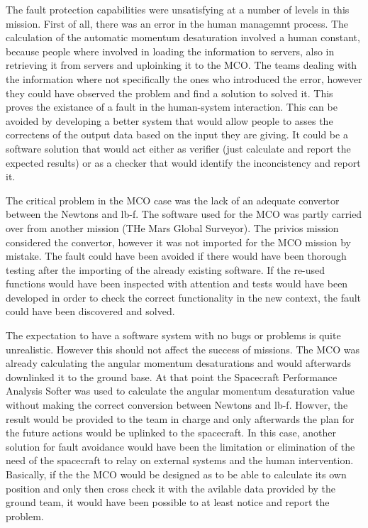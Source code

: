 The fault protection capabilities were unsatisfying at a number of levels in
this mission. First of all, there was an error in the human managemnt process.
The calculation of the automatic momentum desaturation involved a human
constant, because people where involved in loading the information to servers,
also in retrieving it from servers and uploinking it to the MCO. The teams
dealing with the information where not specifically the ones who introduced the
error, however they could have observed the problem and find a solution to
solved it. This proves the existance of a fault in the human-system interaction.
This can be avoided by developing a better system that would allow people to
asses the correctens of the output data based on the input they are giving. It
could be a software solution that would act either as verifier (just calculate
and report the expected results) or as a checker that would identify the
inconcistency and report it.

The critical problem in the MCO case was the lack of an adequate convertor
between the Newtons and lb-f. The software used for the MCO was partly carried
over from another mission (THe Mars Global Surveyor). The privios mission
considered the convertor, however it was not imported for the MCO mission by mistake. The fault could have been
avoided if there would have been thorough testing after the importing of the
already existing software. If the re-used functions would have been inspected
with attention and tests would have been developed in order to check the correct
functionality in the new context, the fault could have been discovered and
solved.

The expectation to have a software system with no bugs or problems is quite
unrealistic. However this should not affect the success of missions. The MCO was
already calculating the angular momentum desaturations and would afterwards
downlinked it to the ground base. At that point the Spacecraft Performance
Analysis Softer was used to calculate the angular momentum desaturation value
without making the correct conversion between Newtons and lb-f. Howver, the
result would be provided to the team in charge and only afterwards the plan for
the future actions would be uplinked to the spacecraft. In this case, another
solution for fault avoidance would have been the limitation or elimination of
the need of the spacecraft to relay on external systems and the human
intervention. Basically, if the the MCO would be designed as to be able to
calculate its own position and only then cross check it with the avilable data
provided by the ground team, it would have been possible to at least notice and
report the problem.

